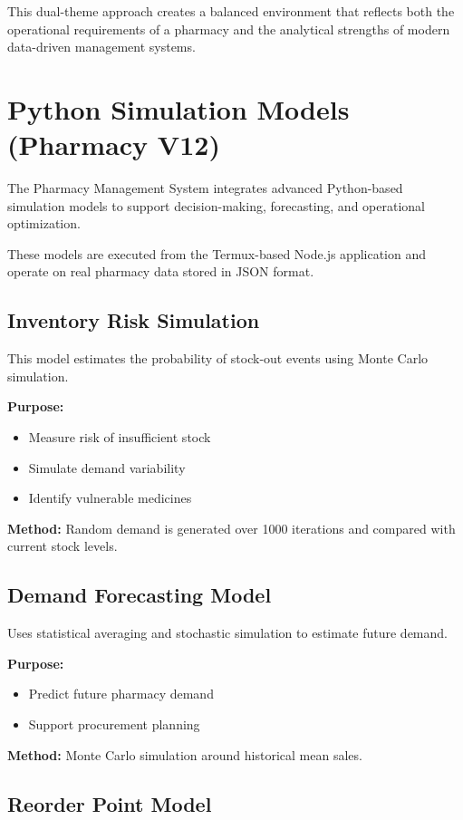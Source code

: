 \documentclass[12pt,a4paper]{article}
\begin{document}
This dual-theme approach creates a balanced environment that reflects both the operational requirements of a pharmacy and the analytical strengths of modern data-driven management systems.



\section{Python Simulation Models (Pharmacy V12) }

The Pharmacy Management System integrates advanced Python-based simulation models to support decision-making, forecasting, and operational optimization.

These models are executed from the Termux-based Node.js application and operate on real pharmacy data stored in JSON format.

\subsection{ Inventory Risk Simulation}

This model estimates the probability of stock-out events using Monte Carlo simulation.

\textbf{Purpose:}
\begin{itemize}
\item Measure risk of insufficient stock
\item Simulate demand variability
\item Identify vulnerable medicines
\end{itemize}

\textbf{Method:}
Random demand is generated over 1000 iterations and compared with current stock levels.

\subsection{ Demand Forecasting Model}

Uses statistical averaging and stochastic simulation to estimate future demand.

\textbf{Purpose:}
\begin{itemize}
\item Predict future pharmacy demand
\item Support procurement planning
\end{itemize}

\textbf{Method:}
Monte Carlo simulation around historical mean sales.

\subsection{ Reorder Point Model}
\end{document}
